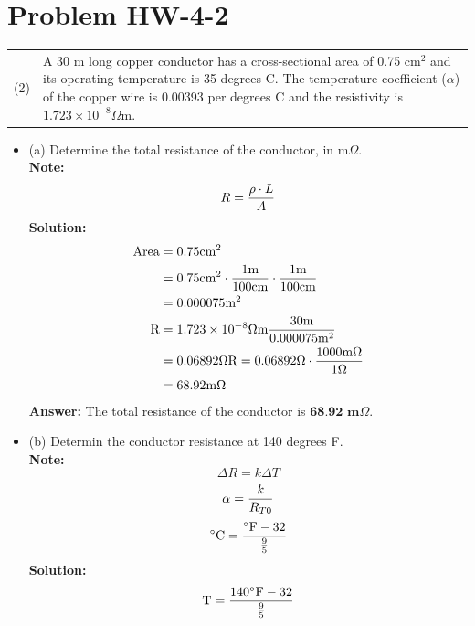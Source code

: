 \documentclass{article}
\newcommand{\problemstatement}[3]{
\noindent
\begin{tabular}{ m{0.5cm} m{42em}}
	({#1}) & {#2}
\end{tabular}
}
\begin{document}
\section{Problem HW-4-2}
\problemstatement{2}{A 30 m long copper conductor has a cross-sectional area of 0.75 $\text{cm}^2$ and its operating temperature is 35 degrees C. The temperature coefficient ($\alpha$) of the copper wire is 0.00393 per degrees C and the resistivity is $1.723 \times 10^{-8} \Omega \text{m}$.}{}
\begin{itemize}
	\item (a) Determine the total resistance of the conductor, in $\text{m} \Omega$. \\
		\textbf{Note:} \\
		\begin{equation}
			R = { \rho \cdot L \over A }
		\end{equation}
		\textbf{Solution:}
		\begin{align*}
			\text{Area} &= 0.75 \text{cm}^2 \\
			 	&= 0.75 \text{cm}^2 \cdot { 1 \text{m} \over 100 \text{cm} } \cdot { 1 \text{m} \over 100 \text{cm} } \\
			 	&= 0.000075 \text{m}^2 \\
			 \text{R} &= 1.723 \times 10^{-8} \Omega \text{m} {30 \text{m} \over 0.000075 \text{m}^2 } \\
			 	&= 0.06892 \Omega
			 \text{R} = 0.06892 \Omega \cdot { 1000 \text{m} \Omega \over 1 \Omega } \\
			 	&= 68.92 \text{m} \Omega
		\end{align*}
		\textbf{Answer:} The total resistance of the conductor is \textbf{$ \textbf{68.92 m} \Omega$}.
	\item (b) Determin the conductor resistance at 140 degrees F. \\
		\textbf{Note:} \\
		\begin{equation}
			\Delta R = k \Delta T
		\end{equation}
		\begin{equation}
			\alpha = { k \over R_{T0} }
		\end{equation}
		\begin{equation}
			^{\circ} \text{C} = {^{\circ} \text{F} - 32 \over {9 \over 5}}
		\end{equation}
		\textbf{Solution:}
		\begin{align*}
			\text{T} &= {140 ^{\circ} \text{F} - 32 \over {9 \over 5}} \\

\end{align*}
\end{itemize}
\end{document}

